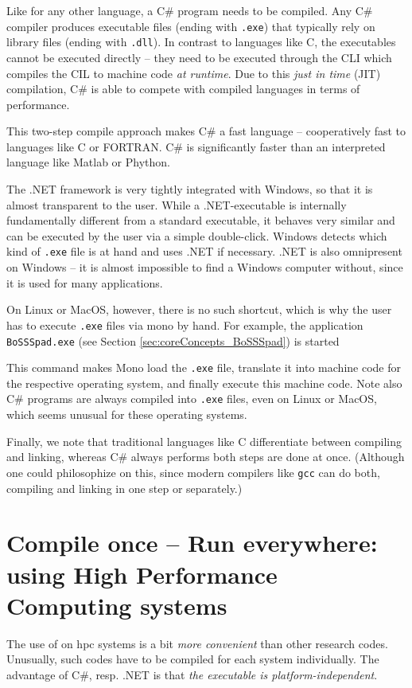 \documentclass[a4paper,10pt]{report} %
\begin{document}
Like for any other language, a C\# program needs to be compiled. Any C\# compiler produces executable 
files (ending with \texttt{.exe}) that typically rely on library files (ending with \texttt{.dll}). 
In contrast to languages like C, the executables cannot be executed directly -- they need to be executed
 through the CLI which compiles the CIL to machine code \emph{at runtime}. Due to this \emph{just in time} (JIT) 
compilation, C\# is able to compete with compiled languages in terms of performance.

This two-step compile approach makes C\# a fast language -- cooperatively fast to 
languages like C or FORTRAN. C\# is significantly faster than an interpreted language like 
Matlab or Phython. 

The .NET framework is very tightly integrated with Windows, so that it is almost transparent to the user. 
While a .NET-executable is internally fundamentally different from a standard executable, it behaves very similar 
and can be executed by the user via a simple double-click. Windows detects which kind of \texttt{.exe} file is 
at hand and uses .NET if necessary. .NET is also omnipresent on Windows -- it is almost impossible to find a 
Windows computer without,
since it is used for many applications.

On Linux or MacOS, however, there is no such shortcut, which is why the user has to execute \texttt{.exe} 
files via mono by hand. For example, the \BoSSSpad{} application \texttt{BoSSSpad.exe} 
(see Section \ref{sec:coreConcepts_BoSSSpad}) is started


This command makes Mono load the \texttt{.exe} file, translate it into machine code for the respective 
operating system, and finally execute this machine code.
Note also C\# programs are always compiled into {\tt .exe} files, even on Linux or MacOS,
which seems unusual for these operating systems. 

Finally, we note that traditional languages like C differentiate between compiling and linking, whereas 
C\# always performs both steps are done at once.
(Although one could philosophize on this, since 
modern compilers like {\tt gcc} can do both, compiling and linking
in one step or separately.)


\section{Compile once -- Run everywhere: using High Performance Computing systems}
\label{sec:HPCuse}
The use of \BoSSS{} on \ac{hpc} systems is a bit \emph{more convenient} than other 
research codes.
Unusually, such codes have to be compiled for each system individually. 
The advantage of C\#, resp. .NET is that \emph{the executable is platform-independent}.
\end{document}
